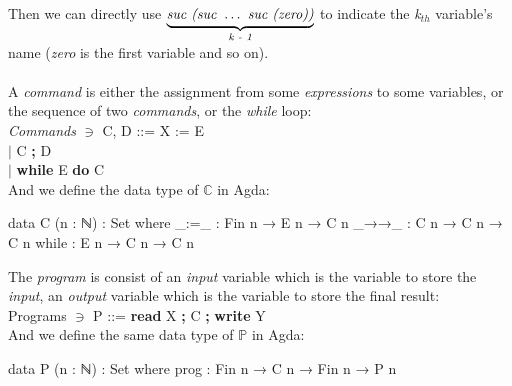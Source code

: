 \documentclass{jfrarticle}
\begin{document}
Then we can directly use $\underbrace{\mbox{\textit{suc (suc }} \dots \mbox{\textit{ suc (zero))}}}_{\textit{k - 1}}$ to indicate the \textit{k}$_{th}$ variable's name (\textit{zero} is the first variable and so on).\\\\
A \textit{command} is either the assignment from some \textit{expressions} to some variables, or the sequence of two \textit{commands}, or the \textit{while} loop:\\
\textit{Commands} \hspace{0.35cm}$\ni$\hspace{0.35cm} C, D\hspace{0.1cm} ::= X := E\\
\indent\hspace{3.9cm}$|$ C \textbf{;} D\\
\indent\hspace{3.9cm}$|$ \textbf{while} E \textbf{do} C\\
And we define the data type of $\mathds{C}$ in Agda:
\begin{code}[fontsize=\small]
data C (n : ℕ) : Set where
  _:=_   : Fin n  → E n → C n
  _→→_ : C n → C n → C n
  while  : E n → C n → C n

\end{code}
The \textit{program} is consist of an \textit{input} variable which is the variable to store the \textit{input}, an \textit{output} variable which is the variable to store the final result:\\
Programs \hspace{0.5cm}$\ni$\hspace{0.4cm} P\hspace{0.6cm} ::= \textbf{read} X \textbf{;} C \textbf{;} \textbf{write} Y\\
And we define the same data type of $\mathds{P}$ in Agda:
\begin{code}[fontsize=\small]
data P (n : ℕ) : Set where
  prog : Fin n → C n → Fin n → P n
\end{code}
\end{document}
